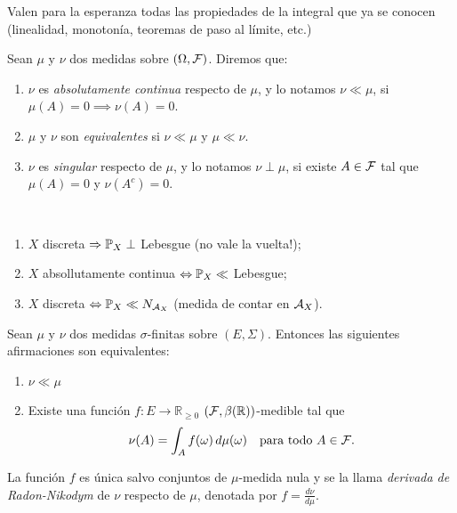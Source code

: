 \begin{note}
	Valen para la esperanza todas las propiedades de la integral que ya se conocen (linealidad, monotonía, teoremas de paso al límite, etc.)
\end{note}

\begin{definition}
	Sean $\mu$ y $\nu$ dos medidas sobre $(\Omega, \mathcal{F})$. Diremos que:
	\begin{enumerate}
		\item $\nu$ es \textit{absolutamente continua} respecto de $\mu$, y lo notamos $\nu \ll \mu$, si $\mu(A) = 0 \implies \nu(A) = 0$.

		\item $\mu$ y $\nu$ son \textit{equivalentes} si $\nu \ll \mu$ y $\mu \ll \nu$.

		\item $\nu$ es \textit{singular} respecto de $\mu$, y lo notamos $\nu \perp \mu$, si existe $A \in \mathcal{F}$ tal que $\mu(A) = 0$ y $\nu(A^{c}) = 0$.
	\end{enumerate}
\end{definition}

\begin{eg}~
	\begin{enumerate}
		\item $X$ discreta $\Rightarrow \mathbb{P}_{X} \perp$ Lebesgue (no vale la vuelta!);

		\item $X$ absollutamente continua $\Leftrightarrow \mathbb{P}_{X} \ll$ Lebesgue;

		\item $X$ discreta $\Leftrightarrow \mathbb{P}_{X} \ll N_{\mathcal{A}_{X}}$ (medida de contar en $\mathcal{A}_{X}$).
	\end{enumerate}
\end{eg}

\begin{theorem}
    Sean \(\mu\) y \(\nu\) dos medidas \(\sigma\)-finitas sobre \((E, \Sigma)\). Entonces las siguientes afirmaciones son equivalentes:
    \begin{enumerate}
        \item \(\nu \ll \mu\)

		\item Existe una función \(f: E \to \mathbb{R}_{\ge 0}\) \((\mathcal{F}, \beta(\mathbb{R}))\)-medible tal que
        \[
		\nu(A) = \int_{A} f(\omega) \, d\mu(\omega) \quad \text{para todo } A \in \mathcal{F}.
        \]
    \end{enumerate}
    La función \(f\) es única salvo conjuntos de \(\mu\)-medida nula y se la llama \textit{derivada de Radon-Nikodym} de \(\nu\) respecto de \(\mu\), denotada por \(f = \frac{d\nu}{d\mu}\).
\end{theorem}

